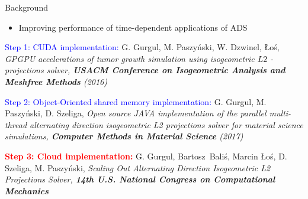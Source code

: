\documentclass[c]{beamer}
\newcommand{\inred}[1]{\textcolor{red}{#1}}
\newcommand{\inblue}[1]{\textcolor{blue}{#1}}
\begin{document}
\begin{frame}{Background}

\begin{itemize}
  \item Improving performance of time-dependent applications of ADS
\end{itemize}

\inblue{Step 1: CUDA implementation: }\break
G. Gurgul, M. Paszy\'{n}ski, W. Dzwinel, \L{}o\'{s},
\it{GPGPU accelerations of tumor growth simulation using isogeometric $L2$ - projections solver}, {\bf USACM Conference on Isogeometric Analysis and Meshfree Methods} (2016) 

\vspace{1mm}
\inblue{Step 2: Object-Oriented shared memory implementation: }\break
G. Gurgul, M. Paszy\'{n}ski, D. Szeliga, 
\it{Open source JAVA implementation of the parallel multi-thread alternating direction isogeometric L2 projections solver for material science simulations}, {\bf Computer Methods in Material Science} (2017) 

\vspace{1mm}
\inred{\bf Step 3: Cloud implementation: }\break
G. Gurgul, Bartosz~Bali\'{s},  Marcin \L{}o\'{s}, D. Szeliga, M. Paszy\'{n}ski, \it{Scaling Out Alternating Direction Isogeometric L2 Projections Solver}, {\bf 14th U.S. National Congress on Computational Mechanics}


\end{frame}





\end{document}
